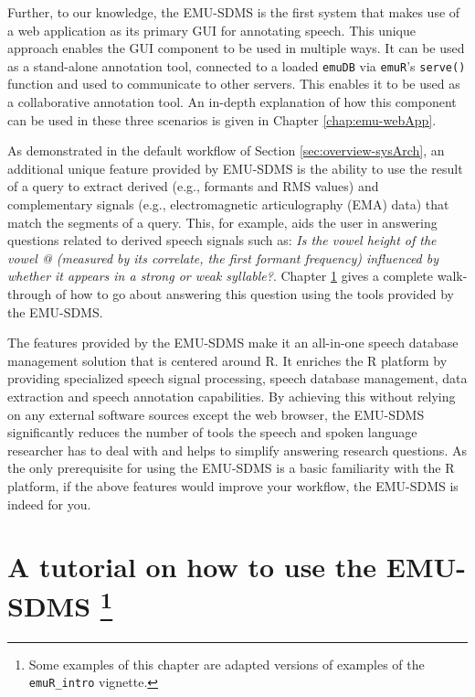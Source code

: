 \documentclass[]{book}
\let\rmarkdownfootnote\footnote%
\def\footnote{\protect\rmarkdownfootnote}
\begin{document}
Further, to our knowledge, the EMU-SDMS is the first system that makes use of a web application as its primary GUI for annotating speech. This unique approach enables the GUI component to be used in multiple ways. It can be used as a stand-alone annotation tool, connected to a loaded \texttt{emuDB} via \texttt{emuR}'s \texttt{serve()} function and used to communicate to other servers. This enables it to be used as a collaborative annotation tool. An in-depth explanation of how this component can be used in these three scenarios is given in Chapter \ref{chap:emu-webApp}.

As demonstrated in the default workflow of Section \ref{sec:overview-sysArch}, an additional unique feature provided by EMU-SDMS is the ability to use the result of a query to extract derived (e.g., formants and RMS values) and complementary signals (e.g., electromagnetic articulography (EMA) data) that match the segments of a query. This, for example, aids the user in answering questions related to derived speech signals such as: \emph{Is the vowel height of the vowel @ (measured by its correlate, the first formant frequency) influenced by whether it appears in a strong or weak syllable?}. Chapter \ref{chap:tutorial} gives a complete walk-through of how to go about answering this question using the tools provided by the EMU-SDMS.

The features provided by the EMU-SDMS make it an all-in-one speech database management solution that is centered around R. It enriches the R platform by providing specialized speech signal processing, speech database management, data extraction and speech annotation capabilities. By achieving this without relying on any external software sources except the web browser, the EMU-SDMS significantly reduces the number of tools the speech and spoken language researcher has to deal with and helps to simplify answering research questions. As the only prerequisite for using the EMU-SDMS is a basic familiarity with the R platform, if the above features would improve your workflow, the EMU-SDMS is indeed for you.

\hypertarget{chap:tutorial}{%
\chapter[A tutorial on how to use the EMU-SDMS ]{\texorpdfstring{A tutorial on how to use the EMU-SDMS \footnote{Some examples of this chapter are adapted versions of examples of the \texttt{emuR\_intro} vignette.}}{A tutorial on how to use the EMU-SDMS }}\label{chap:tutorial}}
\end{document}
